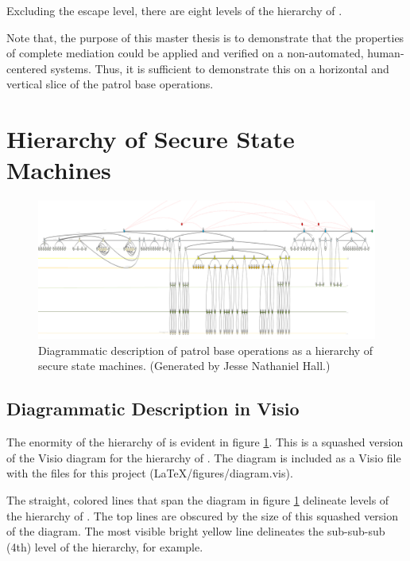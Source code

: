 \documentclass[../../main/main.tex]{subfiles}
\begin{document}
Excluding the escape level, there are eight levels of the hierarchy of .

Note that, the purpose of this master thesis is to demonstrate that the properties of complete mediation could be applied and verified on a non-automated, human-centered systems. Thus, it is sufficient to demonstrate this on a horizontal and vertical slice of the patrol base operations.  

\section{Hierarchy of Secure State Machines}
\begin{figure}[h]
\includegraphics[width=\textwidth]{../figures/overalldiagramsquashed.png}
\caption{\label{overalldiagramsquashed}Diagrammatic description of patrol base operations as a hierarchy of secure state machines.  (Generated by Jesse Nathaniel Hall.)}
\end{figure}

\subsection{Diagrammatic Description in Visio}\label{ssec:overalldiagram}
The enormity of the hierarchy of  is evident in figure \ref{overalldiagramsquashed}.  This is a squashed version of the Visio diagram for the hierarchy of . The diagram is included as a Visio file with the files for this project (LaTeX/figures/diagram.vis).  

The straight, colored lines that span the diagram in figure \ref{overalldiagramsquashed} delineate levels of the hierarchy of .  The top lines are obscured by the size of this squashed version of the diagram.  The most visible bright yellow line delineates the sub-sub-sub (4th) level of the hierarchy, for example.
\end{document}
